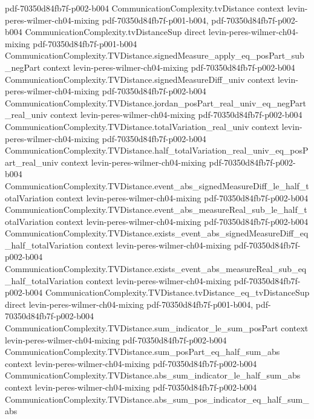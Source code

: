 \begin{theorem}
  {pdf-70350d84fb7f-p002-b004}
\proofstep
  {CommunicationComplexity.tvDistance}
  {context}
  {levin-peres-wilmer-ch04-mixing}
  {pdf-70350d84fb7f-p001-b004,
    pdf-70350d84fb7f-p002-b004}
\proofstep
  {CommunicationComplexity.tvDistanceSup}
  {direct}
  {levin-peres-wilmer-ch04-mixing}
  {pdf-70350d84fb7f-p001-b004}
\proofstep
  {CommunicationComplexity.TVDistance.signedMeasure_apply_eq_posPart_sub_negPart}
  {context}
  {levin-peres-wilmer-ch04-mixing}
  {pdf-70350d84fb7f-p002-b004}
\proofstep
  {CommunicationComplexity.TVDistance.signedMeasureDiff_univ}
  {context}
  {levin-peres-wilmer-ch04-mixing}
  {pdf-70350d84fb7f-p002-b004}
\proofstep
  {CommunicationComplexity.TVDistance.jordan_posPart_real_univ_eq_negPart_real_univ}
  {context}
  {levin-peres-wilmer-ch04-mixing}
  {pdf-70350d84fb7f-p002-b004}
\proofstep
  {CommunicationComplexity.TVDistance.totalVariation_real_univ}
  {context}
  {levin-peres-wilmer-ch04-mixing}
  {pdf-70350d84fb7f-p002-b004}
\proofstep
  {CommunicationComplexity.TVDistance.half_totalVariation_real_univ_eq_posPart_real_univ}
  {context}
  {levin-peres-wilmer-ch04-mixing}
  {pdf-70350d84fb7f-p002-b004}
\proofstep
  {CommunicationComplexity.TVDistance.event_abs_signedMeasureDiff_le_half_totalVariation}
  {context}
  {levin-peres-wilmer-ch04-mixing}
  {pdf-70350d84fb7f-p002-b004}
\proofstep
  {CommunicationComplexity.TVDistance.event_abs_measureReal_sub_le_half_totalVariation}
  {context}
  {levin-peres-wilmer-ch04-mixing}
  {pdf-70350d84fb7f-p002-b004}
\proofstep
  {CommunicationComplexity.TVDistance.exists_event_abs_signedMeasureDiff_eq_half_totalVariation}
  {context}
  {levin-peres-wilmer-ch04-mixing}
  {pdf-70350d84fb7f-p002-b004}
\proofstep
  {CommunicationComplexity.TVDistance.exists_event_abs_measureReal_sub_eq_half_totalVariation}
  {context}
  {levin-peres-wilmer-ch04-mixing}
  {pdf-70350d84fb7f-p002-b004}
\proofstep
  {CommunicationComplexity.TVDistance.tvDistance_eq_tvDistanceSup}
  {direct}
  {levin-peres-wilmer-ch04-mixing}
  {pdf-70350d84fb7f-p001-b004,
    pdf-70350d84fb7f-p002-b004}
\proofstep
  {CommunicationComplexity.TVDistance.sum_indicator_le_sum_posPart}
  {context}
  {levin-peres-wilmer-ch04-mixing}
  {pdf-70350d84fb7f-p002-b004}
\proofstep
  {CommunicationComplexity.TVDistance.sum_posPart_eq_half_sum_abs}
  {context}
  {levin-peres-wilmer-ch04-mixing}
  {pdf-70350d84fb7f-p002-b004}
\proofstep
  {CommunicationComplexity.TVDistance.abs_sum_indicator_le_half_sum_abs}
  {context}
  {levin-peres-wilmer-ch04-mixing}
  {pdf-70350d84fb7f-p002-b004}
\proofstep
  {CommunicationComplexity.TVDistance.abs_sum_pos_indicator_eq_half_sum_abs}

\end{theorem}
